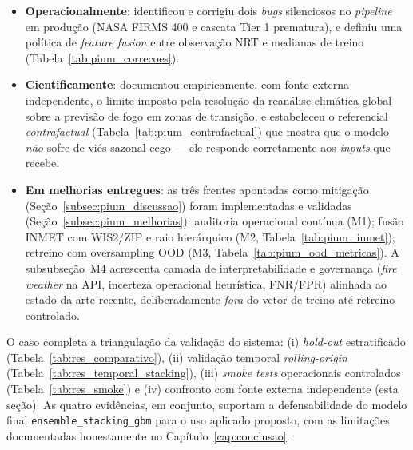 \begin{itemize}
  \item \textbf{Operacionalmente}: identificou e corrigiu dois \emph{bugs} silenciosos no \emph{pipeline} em produção (NASA FIRMS 400 e cascata Tier 1 prematura), e definiu uma política de \emph{feature fusion} entre observação NRT e medianas de treino (Tabela~\ref{tab:pium_correcoes}).
  \item \textbf{Cientificamente}: documentou empiricamente, com fonte externa independente, o limite imposto pela resolução da reanálise climática global sobre a previsão de fogo em zonas de transição, e estabeleceu o referencial \emph{contrafactual} (Tabela~\ref{tab:pium_contrafactual}) que mostra que o modelo \emph{não} sofre de viés sazonal cego --- ele responde corretamente aos \emph{inputs} que recebe.
  \item \textbf{Em melhorias entregues}: as três frentes apontadas como mitigação (Seção~\ref{subsec:pium_discussao}) foram implementadas e validadas (Seção~\ref{subsec:pium_melhorias}): auditoria operacional contínua (M1); fusão INMET com WIS2/ZIP e raio hierárquico (M2, Tabela~\ref{tab:pium_inmet}); retreino com oversampling OOD (M3, Tabela~\ref{tab:pium_ood_metricas}). A subsubseção~M4 acrescenta camada de interpretabilidade e governança (\emph{fire weather} na API, incerteza operacional heurística, FNR/FPR) alinhada ao estado da arte recente, deliberadamente \emph{fora} do vetor de treino até retreino controlado.
\end{itemize}

O caso completa a triangulação da validação do sistema: (i) \emph{hold-out} estratificado (Tabela~\ref{tab:res_comparativo}), (ii) validação temporal \emph{rolling-origin} (Tabela~\ref{tab:res_temporal_stacking}), (iii) \emph{smoke tests} operacionais controlados (Tabela~\ref{tab:res_smoke}) e (iv) confronto com fonte externa independente (esta seção). As quatro evidências, em conjunto, suportam a defensabilidade do modelo final \texttt{ensemble\_stacking\_gbm} para o uso aplicado proposto, com as limitações documentadas honestamente no Capítulo~\ref{cap:conclusao}.

